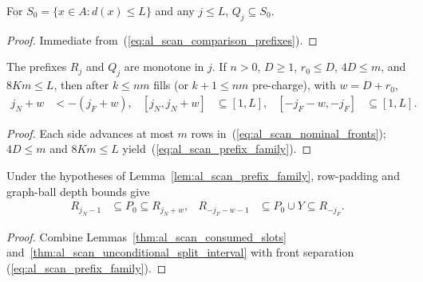 \begin{lemma}
    \label{thm:al_scan_positive_prefix_collar}
    \leanok
    For $S_0=\{x\in A:d(x)\le L\}$ and any $j\le L$, $Q_j\subseteq S_0$.
\end{lemma}
\begin{proof}\leanok
    Immediate from~(\ref{eq:al_scan_comparison_prefixes}).
\end{proof}

\begin{lemma}
    \label{lem:al_scan_prefix_family}
    \leanok
    The prefixes $R_j$ and $Q_j$ are monotone in $j$. If $n>0$, $D\ge1$,
    $r_0\le D$, $4D\le m$, and $8Km\le L$, then after $k\le nm$ fills (or
    $k+1\le nm$ pre-charge), with $w=D+r_0$,
    \begin{align}
        j_N+w         & <-(j_F+w),      &
        [j_N,j_N+w]   & \subseteq[1,L], &
        [-j_F-w,-j_F] & \subseteq[1,L].
        \label{eq:al_scan_prefix_family}
    \end{align}
\end{lemma}
\begin{proof}\leanok
    Each side advances at most $m$ rows in~(\ref{eq:al_scan_nominal_fronts});
    $4D\le m$ and $8Km\le L$ yield~(\ref{eq:al_scan_prefix_family}).
\end{proof}

\begin{lemma}
    \label{thm:al_scan_prefix_sandwich}
    \leanok
    Under the hypotheses of Lemma~\ref{lem:al_scan_prefix_family}, row-padding
    and graph-ball depth bounds give
    \begin{align}
        R_{j_N-1}    & \subseteq P_0\subseteq R_{j_N+w},      &
        R_{-j_F-w-1} & \subseteq P_0\cup Y\subseteq R_{-j_F}.
        \label{eq:al_scan_prefix_sandwich}
    \end{align}
\end{lemma}
\begin{proof}\leanok
    Combine Lemmas~\ref{thm:al_scan_consumed_slots}
    and~\ref{thm:al_scan_unconditional_split_interval} with front separation
    (\ref{eq:al_scan_prefix_family}).
\end{proof}

